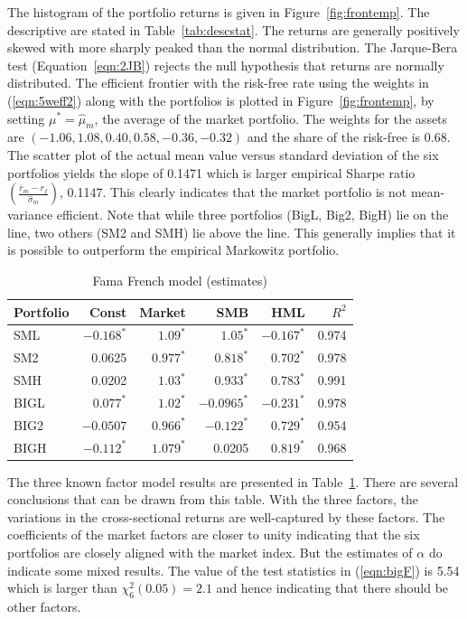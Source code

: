 The histogram of the portfolio returns is given in Figure~\ref{fig:frontemp}. The descriptive are stated in Table~\ref{tab:descstat}. The returns are generally positively skewed with more sharply peaked than the normal distribution. The Jarque-Bera test (Equation~\ref{eqn:2JB}) rejects the null hypothesis that returns are normally distributed. The efficient frontier with the risk-free rate using the weights in (\ref{eqn:5weff2}) along with the portfolios is plotted in Figure~\ref{fig:frontemp}, by setting $\mu^*=\hat{\mu}_m$, the average of the market portfolio. The weights for the assets are $(-1.06,1.08,0.40,0.58,-0.36,-0.32)$ and the share of the risk-free is 0.68. The scatter plot of the actual mean value versus standard deviation of the six portfolios yields the slope of 0.1471 which is larger empirical Sharpe ratio $\left(\frac{\overline{r}_m - r_f}{\hat{\sigma}_m}\right)$, 0.1147. This clearly indicates that the market portfolio is not mean-variance efficient. Note that while three portfolios (BigL, Big2, BigH) lie on the line, two others (SM2 and SMH) lie above the line. This generally implies that it is possible to outperform the empirical Markowitz portfolio. 


\begin{table}
\centering
\caption{Fama French model (estimates)\label{tab:famafrenchmodel}}
\begin{tabular}{lrrrrr}
Portfolio & Const & Market & SMB & HML & $R^2$ \\ \hline
SML & $-0.168^*$ & $1.09^*$ & $1.05^*$ & $-0.167^*$ & 0.974 \\
SM2 & 0.0625 & $0.977^*$ & $0.818^*$ & $0.702^*$ & 0.978 \\
SMH & 0.0202 & $1.03^*$ & $0.933^*$ & $0.783^*$ & 0.991 \\
BIGL & $0.077^*$ & $1.02^*$ & $-0.0965^*$ & $-0.231^*$ & 0.978 \\
BIG2 & $-0.0507$ & $0.966^*$ & $-0.122^*$ & $0.729^*$ & 0.954 \\
BIGH & $-0.112^*$ & $1.079^*$ & 0.0205 & $0.819^*$ & 0.968
\end{tabular}
\end{table}


The three known factor model results are presented in Table~\ref{tab:famafrenchmodel}. There are several conclusions that can be drawn from this table. With the three factors, the variations in the cross-sectional returns are well-captured by these factors. The coefficients of the market factors are closer to unity indicating that the six portfolios are closely aligned with the market index. But the estimates of $\alpha$ do indicate some mixed results. The value of the test statistics in (\ref{eqn:bigF}) is 5.54 which is larger than $\chi_6^2(0.05)=2.1$ and hence indicating that there should be other factors.


